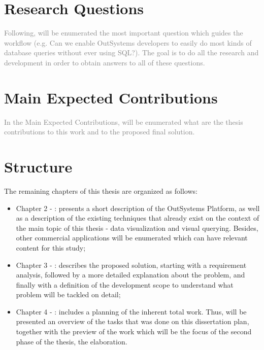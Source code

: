 \section{Research Questions}
\label{sec:research_questions}
\textcolor{gray}{Following, will be enumerated the most important question which guides the workflow
(e.g. Can we enable OutSystems developers to easily do most kinds of database 
queries without ever using SQL?). The goal is to do all the research and 
development in order to obtain answers to all of these questions.}

\section{Main Expected Contributions}
\label{sec:main_exp_contributions}
\textcolor{gray}{In the Main Expected Contributions, will be enumerated what are the thesis 
contributions to this work and to the proposed final solution.}

\section{Structure}
\label{sec:structure}

The remaining chapters of this thesis are organized as follows:

\begin{itemize}
  \item Chapter 2 - : presents a short description
  of the OutSystems Platform, as well as a description of the existing techniques
  that already exist on the context of the main topic of this thesis - data visualization
  and visual querying. Besides, other commercial applications will be enumerated 
  which can have relevant content for this study;
  \item Chapter 3 - : describes the proposed solution,
  starting with a requirement analysis, followed by a more detailed explanation
  about the problem, and finally with a definition of the development scope to
  understand what problem will be tackled on detail;
  \item Chapter 4 - : includes a planning
  of the inherent total work. Thus, will be presented an overview of the tasks that
  was done on this dissertation plan, together with the preview of the work which
  will be the focus of the second phase of the thesis, the elaboration.
\end{itemize}
